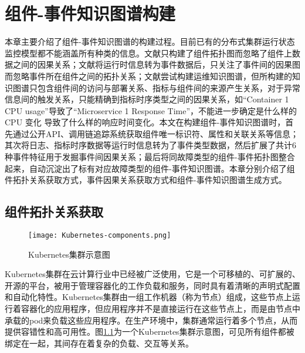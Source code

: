 \chapter{组件-事件知识图谱构建}
本章主要介绍了组件-事件知识图谱的构建过程。目前已有的分布式集群运行状态监控模型都不能涵盖所有种类的信息。文献\parencite{wang2019grano}只构建了组件拓扑图而忽略了组件上数据之间的因果关系；文献\parencite{nie2016mining-causality-graph}将运行时信息转为事件数据后，只关注了事件间的因果图而忽略事件所在组件之间的拓扑关系；文献\parencite{qiu2020causality-mining-knowledge-graph}尝试构建运维知识图谱，但所构建的知识图谱只包含组件间的访问与部署关系、指标与组件间的来源产生关系，对于异常信息间的触发关系，只能精确到指标时序类型之间的因果关系，如“Container
1 CPU usage”导致了“Microservice 1 Response Time”，不能进一步确定是什么样的 CPU 变化
导致了什么样的响应时间变化。本文在构建组件-事件知识图谱时，首先通过公开API、调用链追踪系统获取组件唯一标识符、属性和关联关系等信息；其次将日志、指标时序数据等运行时信息转为了事件类型数据，然后扩展了共计6种事件特征用于发掘事件间因果关系；最后将同故障类型的组件-事件拓扑图整合起来，自动沉淀出了标有对应故障类型的组件-事件知识图谱。本章分别介绍了组件拓扑关系获取方式，事件因果关系获取方式和组件-事件知识图谱生成方式。

\section{组件拓扑关系获取}
\begin{figure}[htbp]
    \centering
    \texttt{[image: Kubernetes-components.png]}
    \caption{Kubernetes集群示意图\label{Kubernetes-components}}
\end{figure}
Kubernetes集群\cite{bernstein2014containers}在云计算行业中已经被广泛使用，它是一个可移植的、可扩展的、开源的平台，被用于管理容器化的工作负载和服务，同时具有着清晰的声明式配置和自动化特性。Kubernetes集群由一组工作机器（称为节点）组成，这些节点上运行着容器化的应用程序，但应用程序并不是直接运行在这些节点上，而是由节点中承载的pod来负载这些应用程序。在生产环境中，集群通常运行着多个节点，从而提供容错性和高可用性。图\ref{Kubernetes-components}为一个Kubernetes集群示意图，可见所有组件都被绑定在一起，其间存在着复杂的负载、交互等关系。

